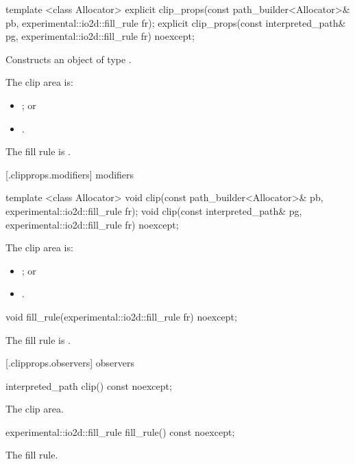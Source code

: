 %
\begin{itemdecl}
template <class Allocator>
explicit clip_props(const path_builder<Allocator>& pb,
  experimental::io2d::fill_rule fr);
explicit clip_props(const interpreted_path& pg, experimental::io2d::fill_rule fr) 
  noexcept;
\end{itemdecl}
\begin{itemdescr}
\pnum
\effects
Constructs an object of type .

\pnum
The clip area is:
\begin{itemize}
\item {}; or
\item {}.
\end{itemize}

\pnum
The fill rule is .
\end{itemdescr}

 [\iotwod.clipprops.modifiers] { modifiers}

%
\begin{itemdecl}
template <class Allocator>
void clip(const path_builder<Allocator>& pb, experimental::io2d::fill_rule fr);
void clip(const interpreted_path& pg, experimental::io2d::fill_rule fr) noexcept;
\end{itemdecl}
\begin{itemdescr}
\pnum
\effects
The clip area is:
\begin{itemize}
\item {}; or
\item {}.
\end{itemize}
\end{itemdescr}

%
\begin{itemdecl}
void fill_rule(experimental::io2d::fill_rule fr) noexcept;
\end{itemdecl}
\begin{itemdescr}
\pnum
\effects
The fill rule is .
\end{itemdescr}

 [\iotwod.clipprops.observers] { observers}

%
\begin{itemdecl}
interpreted_path clip() const noexcept;
\end{itemdecl}
\begin{itemdescr}
\pnum
\returns
The clip area.
\end{itemdescr}

%
\begin{itemdecl}
experimental::io2d::fill_rule fill_rule() const noexcept;
\end{itemdecl}
\begin{itemdescr}
\pnum
\returns
The fill rule.
\end{itemdescr}
